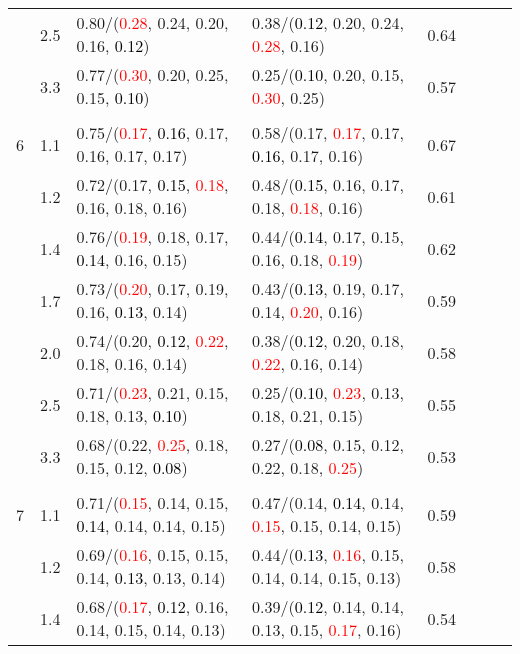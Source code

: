 \documentclass[10pt,a4paper]{report}
\begin{document}
\begin{table}[!htbp]
\begin{center}
{\begin{tabular}{ccllcccc}
			&2.5&0.80/(\textcolor{red}{0.28}, 0.24, 0.20, 0.16, \textcolor{black}{0.12})&0.38/(\textcolor{black}{0.12}, 0.20, 0.24, \textcolor{red}{0.28}, 0.16)&0.64\\
			&3.3&0.77/(\textcolor{red}{0.30}, 0.20, 0.25, 0.15, \textcolor{black}{0.10})&0.25/(\textcolor{black}{0.10}, 0.20, 0.15, \textcolor{red}{0.30}, 0.25)&0.57\\
			&&&&\\
			6			&1.1&0.75/(\textcolor{red}{0.17}, \textcolor{black}{0.16}, 0.17, 0.16, 0.17, 0.17)&0.58/(0.17, \textcolor{red}{0.17}, 0.17, \textcolor{black}{0.16}, 0.17, 0.16)&0.67\\
			&1.2&0.72/(0.17, \textcolor{black}{0.15}, \textcolor{red}{0.18}, 0.16, 0.18, 0.16)&0.48/(\textcolor{black}{0.15}, 0.16, 0.17, 0.18, \textcolor{red}{0.18}, 0.16)&0.61\\
			&1.4&0.76/(\textcolor{red}{0.19}, 0.18, 0.17, \textcolor{black}{0.14}, 0.16, 0.15)&0.44/(\textcolor{black}{0.14}, 0.17, 0.15, 0.16, 0.18, \textcolor{red}{0.19})&0.62\\
			&1.7&0.73/(\textcolor{red}{0.20}, 0.17, 0.19, 0.16, \textcolor{black}{0.13}, 0.14)&0.43/(\textcolor{black}{0.13}, 0.19, 0.17, 0.14, \textcolor{red}{0.20}, 0.16)&0.59\\
			&2.0&0.74/(0.20, \textcolor{black}{0.12}, \textcolor{red}{0.22}, 0.18, 0.16, 0.14)&0.38/(\textcolor{black}{0.12}, 0.20, 0.18, \textcolor{red}{0.22}, 0.16, 0.14)&0.58\\
			&2.5&0.71/(\textcolor{red}{0.23}, 0.21, 0.15, 0.18, 0.13, \textcolor{black}{0.10})&0.25/(\textcolor{black}{0.10}, \textcolor{red}{0.23}, 0.13, 0.18, 0.21, 0.15)&0.55\\
			&3.3&0.68/(0.22, \textcolor{red}{0.25}, 0.18, 0.15, 0.12, \textcolor{black}{0.08})&0.27/(\textcolor{black}{0.08}, 0.15, 0.12, 0.22, 0.18, \textcolor{red}{0.25})&0.53\\
			&&&&\\
			7			&1.1&0.71/(\textcolor{red}{0.15}, 0.14, 0.15, \textcolor{black}{0.14}, 0.14, 0.14, 0.15)&0.47/(0.14, \textcolor{black}{0.14}, 0.14, \textcolor{red}{0.15}, 0.15, 0.14, 0.15)&0.59\\
			&1.2&0.69/(\textcolor{red}{0.16}, 0.15, 0.15, 0.14, \textcolor{black}{0.13}, 0.13, 0.14)&0.44/(\textcolor{black}{0.13}, \textcolor{red}{0.16}, 0.15, 0.14, 0.14, 0.15, 0.13)&0.58\\
			&1.4&0.68/(\textcolor{red}{0.17}, \textcolor{black}{0.12}, 0.16, 0.14, 0.15, 0.14, 0.13)&0.39/(\textcolor{black}{0.12}, 0.14, 0.14, 0.13, 0.15, \textcolor{red}{0.17}, 0.16)&0.54\\

\end{tabular}}
\end{center}
\end{table}
\end{document}
